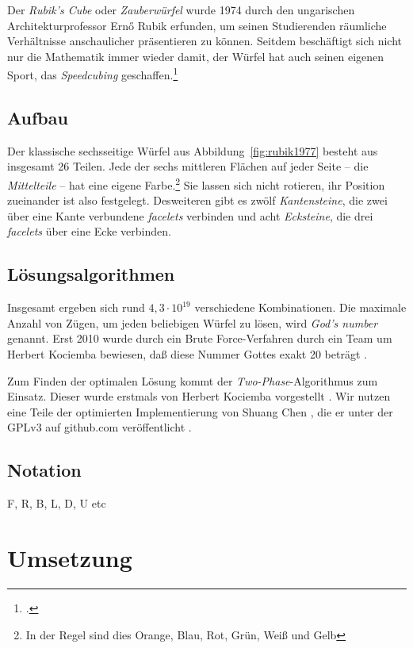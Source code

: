 Der \emph{Rubik's Cube} oder \emph{Zauberwürfel} wurde 1974 durch den
ungarischen Architekturprofessor Ernő Rubik erfunden, um seinen Studierenden
räumliche Verhältnisse anschaulicher präsentieren zu können. Seitdem beschäftigt
sich nicht nur die Mathematik immer wieder damit, der Würfel hat auch seinen
eigenen Sport, das \emph{Speedcubing} geschaffen.\footcite{rubik:history} 

\subsection{Aufbau}  %

Der klassische sechsseitige Würfel aus Abbildung~\ref{fig:rubik1977} besteht aus
insgesamt 26 Teilen. Jede der sechs mittleren Flächen auf jeder Seite – die
\emph{Mittelteile} – hat eine eigene Farbe.\footnote{In der Regel sind dies
Orange, Blau, Rot, Grün, Weiß und Gelb} Sie lassen sich nicht rotieren, ihr
Position zueinander ist also festgelegt. Desweiteren gibt es zwölf
\emph{Kantensteine}, die zwei über eine Kante verbundene \emph{facelets}
verbinden und acht \emph{Ecksteine}, die drei \emph{facelets} über eine Ecke
verbinden.

\subsection{Lösungsalgorithmen}  %

Insgesamt ergeben sich rund \( 4,3 \cdot {10}^{19} \) verschiedene
Kombinationen. Die maximale Anzahl von Zügen, um jeden beliebigen Würfel zu
lösen, wird \emph{God's number} genannt. Erst 2010 wurde durch ein Brute
Force-Verfahren durch ein Team um Herbert Kociemba bewiesen, daß diese Nummer
Gottes exakt 20 beträgt \citep{rubik:godsnumber}.

Zum Finden der optimalen Lösung kommt der \emph{Two-Phase}-Algorithmus zum
Einsatz. Dieser wurde erstmals von Herbert Kociemba vorgestellt
\citep{rubik:kociemba}. Wir nutzen eine Teile der optimierten Implementierung
von Shuang Chen , die er unter der GPLv3 auf github.com veröffentlicht
\citep{rubik:chen}.


\subsection{Notation}  %

F, R, B, L, D, U etc


\section{Umsetzung}  %

